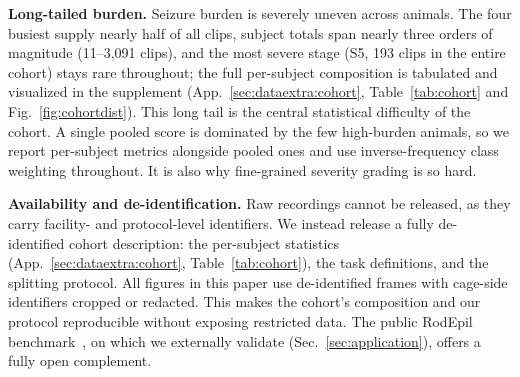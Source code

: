 \noindent\textbf{Long-tailed burden.}
Seizure burden is severely uneven across animals. The four busiest supply nearly
half of all clips, subject totals span nearly three orders of magnitude (11--3{,}091
clips), and the most severe stage (S5, 193 clips in the entire cohort) stays rare
throughout; the full per-subject composition is tabulated and visualized in the
supplement (App.~\ref{sec:dataextra:cohort}, Table~\ref{tab:cohort} and
Fig.~\ref{fig:cohortdist}). This long tail is the central statistical difficulty
of the cohort. A single pooled score is dominated by the few high-burden animals,
so we report per-subject metrics alongside pooled ones and use inverse-frequency
class weighting throughout. It is also why fine-grained severity grading is so hard.

\noindent\textbf{Availability and de-identification.}
Raw recordings cannot be released, as they carry facility- and protocol-level
identifiers. We instead release a fully de-identified cohort description: the
per-subject statistics (App.~\ref{sec:dataextra:cohort}, Table~\ref{tab:cohort}), the task
definitions, and the splitting protocol. All figures in this paper use
de-identified frames with cage-side identifiers cropped or redacted. This makes the
cohort's composition and our protocol reproducible without exposing restricted
data. The public RodEpil benchmark~\cite{rodepil2025}, on which we externally
validate (Sec.~\ref{sec:application}), offers a fully open complement.
